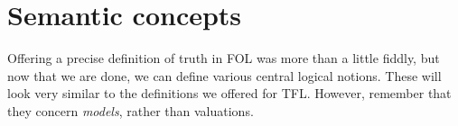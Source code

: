 \chapter{Semantic concepts}

Offering a precise definition of truth in FOL was more than a little fiddly, but now that we are done, we can define various central logical notions. These will look very similar to the definitions we offered for TFL. However, remember that they concern \emph{models}, rather than valuations.


